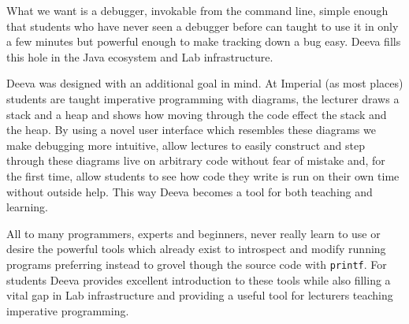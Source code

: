 \documentclass[11pt, a4paper]{article}
\newcommand{\cmd}[1]{{\tt #1}}
\begin{document}
What we want is a debugger, invokable from the command line, simple enough that students who have never seen a debugger before can taught to use it in only a few minutes but powerful enough to make tracking down a bug easy. 
Deeva fills this hole in the Java ecosystem and Lab infrastructure.

Deeva was designed with an additional goal in mind.
At Imperial (as most places) students are taught imperative programming with diagrams, the lecturer draws a stack and a heap and shows how moving through the code effect the stack and the heap.
By using a novel user interface which resembles these diagrams we make debugging more intuitive, allow lectures to easily construct and step through these diagrams live on arbitrary code without fear of mistake and, for the first time, allow students to see how code they write is run on their own time without outside help.
This way Deeva becomes a tool for both teaching and learning.

All to many programmers, experts and beginners, never really learn to use or desire the powerful tools which already exist to introspect and modify running programs preferring instead to grovel though the source code with \cmd{printf}.
For students Deeva provides excellent introduction to these tools while also filling a vital gap in Lab infrastructure and providing a useful tool for lecturers teaching imperative programming.


% 

\end{document}
